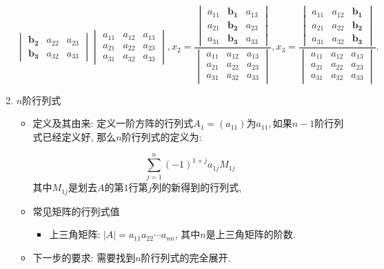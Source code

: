 \begin{enumerate}
\[{\begin{vmatrix}
\boldsymbol{b_{2}} & a_{22} & a_{23}\\
\boldsymbol{b_{3}} & a_{32} & a_{33}
\end{vmatrix}}{\begin{vmatrix}a_{11} & a_{12} & a_{13}\\
a_{21} & a_{22} & a_{23}\\
a_{31} & a_{32} & a_{33}
\end{vmatrix}},x_{2}=\frac{\begin{vmatrix}a_{11} & \boldsymbol{b_{1}} & a_{13}\\
a_{21} & \boldsymbol{b_{2}} & a_{23}\\
a_{31} & \boldsymbol{b_{3}} & a_{33}
\end{vmatrix}}{\begin{vmatrix}a_{11} & a_{12} & a_{13}\\
a_{21} & a_{22} & a_{23}\\
a_{31} & a_{32} & a_{33}
\end{vmatrix}},x_{3}=\frac{\begin{vmatrix}a_{11} & a_{12} & \boldsymbol{b_{1}}\\
a_{21} & a_{22} & \boldsymbol{b_{2}}\\
a_{31} & a_{32} & \boldsymbol{b_{3}}
\end{vmatrix}}{\begin{vmatrix}a_{11} & a_{12} & a_{13}\\
a_{21} & a_{22} & a_{23}\\
a_{31} & a_{32} & a_{33}
\end{vmatrix}}.
\]

\item $n$阶行列式
\begin{itemize}
\item 定义及其由来: 定义一阶方阵的行列式$A_{1}=(a_{11})$为$a_{11},$如果$n-1$阶行列式已经定义好, 那么$n$阶行列式的定义为:

\[
\sum_{j=1}^{n}(-1)^{1+j}a_{1j}M_{1j}
\]
 其中$M_{1j}$是划去$A$的第$1$行第$j$列的新得到的行列式, 
\item 常见矩阵的行列式值
\begin{itemize}
\item 上三角矩阵: $|A|=a_{11}a_{22}\cdots a_{nn}$, 其中$n$是上三角矩阵的阶数.
\end{itemize}
\item 下一步的要求: 需要找到$n$阶行列式的完全展开.
\end{itemize}
\end{enumerate}

